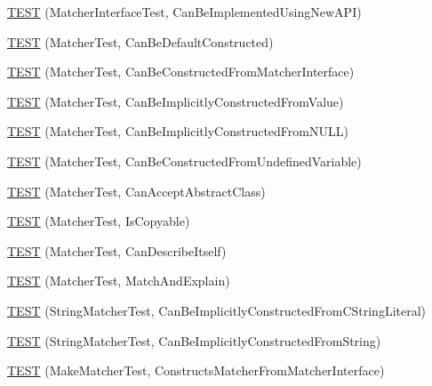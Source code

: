\begin{DoxyCompactItemize}
\item 
\mbox{\hyperlink{namespacetesting_1_1gmock__matchers__test_ad212c5ac3ef7a102a6b1712e40e06a1e}{T\+E\+ST}} (Matcher\+Interface\+Test, Can\+Be\+Implemented\+Using\+New\+A\+PI)
\item 
\mbox{\hyperlink{namespacetesting_1_1gmock__matchers__test_a8843a1545b9e09d73b565cf94f2e5f8b}{T\+E\+ST}} (Matcher\+Test, Can\+Be\+Default\+Constructed)
\item 
\mbox{\hyperlink{namespacetesting_1_1gmock__matchers__test_a3dee288df7e811f817850a5187c42669}{T\+E\+ST}} (Matcher\+Test, Can\+Be\+Constructed\+From\+Matcher\+Interface)
\item 
\mbox{\hyperlink{namespacetesting_1_1gmock__matchers__test_a2bd9ad37a8b9f03b10a15ed322c3249c}{T\+E\+ST}} (Matcher\+Test, Can\+Be\+Implicitly\+Constructed\+From\+Value)
\item 
\mbox{\hyperlink{namespacetesting_1_1gmock__matchers__test_a0de94b029c8a13180276e411f4d75f7f}{T\+E\+ST}} (Matcher\+Test, Can\+Be\+Implicitly\+Constructed\+From\+N\+U\+LL)
\item 
\mbox{\hyperlink{namespacetesting_1_1gmock__matchers__test_a014dc1cd18e74ed71db5b407972e6f50}{T\+E\+ST}} (Matcher\+Test, Can\+Be\+Constructed\+From\+Undefined\+Variable)
\item 
\mbox{\hyperlink{namespacetesting_1_1gmock__matchers__test_a3904607b2566bd4daaec8fa3f5ce1d6e}{T\+E\+ST}} (Matcher\+Test, Can\+Accept\+Abstract\+Class)
\item 
\mbox{\hyperlink{namespacetesting_1_1gmock__matchers__test_ab37bd0e535503a8f39e34b0554b2fb28}{T\+E\+ST}} (Matcher\+Test, Is\+Copyable)
\item 
\mbox{\hyperlink{namespacetesting_1_1gmock__matchers__test_ae85f2ec21822e884ac9ff58741d420d2}{T\+E\+ST}} (Matcher\+Test, Can\+Describe\+Itself)
\item 
\mbox{\hyperlink{namespacetesting_1_1gmock__matchers__test_aee6cef32b22ddd6ce8b87578c3de4198}{T\+E\+ST}} (Matcher\+Test, Match\+And\+Explain)
\item 
\mbox{\hyperlink{namespacetesting_1_1gmock__matchers__test_a17fb479932a88dc4e334327c5e12c8d6}{T\+E\+ST}} (String\+Matcher\+Test, Can\+Be\+Implicitly\+Constructed\+From\+C\+String\+Literal)
\item 
\mbox{\hyperlink{namespacetesting_1_1gmock__matchers__test_a6786eca17f1fc4d6250470cc21ec79f1}{T\+E\+ST}} (String\+Matcher\+Test, Can\+Be\+Implicitly\+Constructed\+From\+String)
\item 
\mbox{\hyperlink{namespacetesting_1_1gmock__matchers__test_ae433e93168010d7316b40ef4a5088d09}{T\+E\+ST}} (Make\+Matcher\+Test, Constructs\+Matcher\+From\+Matcher\+Interface)

\end{DoxyCompactItemize}
